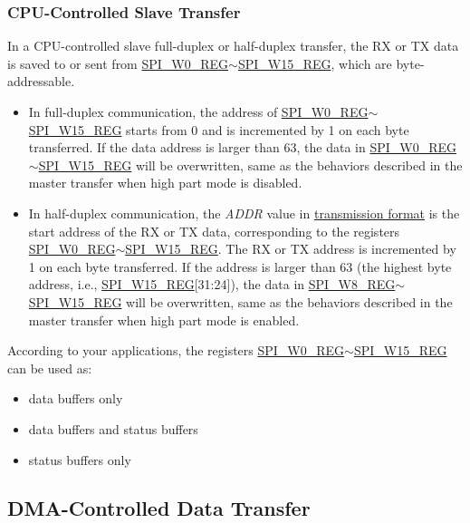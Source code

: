 \documentclass[main\_\_EN.tex]{subfiles}
\begin{document}
\subsubsection{CPU-Controlled Slave Transfer} \label{sec:gp-spi-slave-cpu}

In a CPU-controlled slave full-duplex or half-duplex transfer, the RX or TX data is saved to or sent from \hyperref[regdesc:SPIW0REG]{SPI\_W0\_REG}$\sim$\hyperref[regdesc:SPIW15REG]{SPI\_W15\_REG}, which are byte-addressable.

\begin{itemize}
    \item In full-duplex communication, the address of \hyperref[regdesc:SPIW0REG]{SPI\_W0\_REG}$\sim$\hyperref[regdesc:SPIW15REG]{SPI\_W15\_REG} starts from 0 and is incremented by 1 on each byte transferred. If the data address is larger than 63, the data in \hyperref[regdesc:SPIW0REG]{SPI\_W0\_REG}$\sim$\hyperref[regdesc:SPIW15REG]{SPI\_W15\_REG} will be overwritten, same as the behaviors described in the master transfer when high part mode is disabled. 
    \item In half-duplex communication, the \emph{ADDR} value in \hyperref[slave communication format]{transmission format} is the start address of the RX or TX data, corresponding to the registers \hyperref[regdesc:SPIW0REG]{SPI\_W0\_REG}$\sim$\hyperref[regdesc:SPIW15REG]{SPI\_W15\_REG}. The RX or TX address is incremented by 1 on each byte transferred. If the address is larger than 63 (the highest byte address, i.e., \hyperref[regdesc:SPIW15REG]{SPI\_W15\_REG}[31:24]), the data in \hyperref[regdesc:SPIW8REG]{SPI\_W8\_REG}$\sim$\hyperref[regdesc:SPIW15REG]{SPI\_W15\_REG} will be overwritten, same as the behaviors described in the master transfer when high part mode is enabled. 
\end{itemize}

According to your applications, the registers \hyperref[regdesc:SPIW0REG]{SPI\_W0\_REG}$\sim$\hyperref[regdesc:SPIW15REG]{SPI\_W15\_REG} can be used as:
\begin{itemize}
    \item data buffers only
    \item data buffers and status buffers
    \item status buffers only
\end{itemize}


\subsection{DMA-Controlled Data Transfer}\label{sec:usage-of-gp-spi2-dma-controlled-mode}
\end{document}
